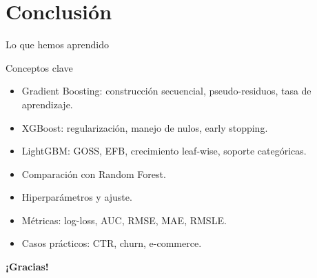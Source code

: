 \documentclass[aspectratio=169, 10pt, xcolor=table]{beamer}
\begin{document}
\section{Conclusión}

\begin{frame}{Lo que hemos aprendido}
    \begin{exampleblock}{Conceptos clave}
        \begin{itemize}
            \item Gradient Boosting: construcción secuencial, pseudo-residuos, tasa de aprendizaje.
            \item XGBoost: regularización, manejo de nulos, early stopping.
            \item LightGBM: GOSS, EFB, crecimiento leaf-wise, soporte categóricas.
            \item Comparación con Random Forest.
            \item Hiperparámetros y ajuste.
            \item Métricas: log-loss, AUC, RMSE, MAE, RMSLE.
            \item Casos prácticos: CTR, churn, e-commerce.
        \end{itemize}
    \end{exampleblock}

\end{frame}

\begin{frame}
    \centering
    \Huge \textbf{¡Gracias!}

\end{frame}
\end{document}
